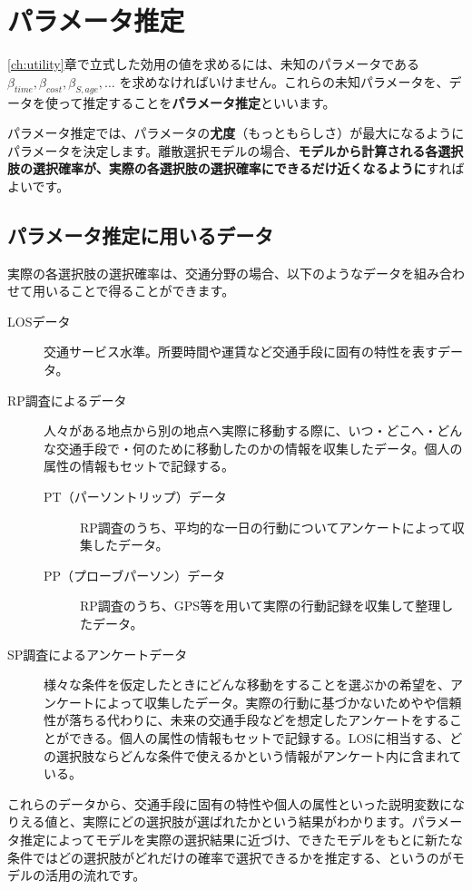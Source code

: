 \chapter{パラメータ推定}\label{ch:parameter_est}

\ref{ch:utility}章で立式した効用の値を求めるには、未知のパラメータである $\beta_{time}, \beta_{cost}, \beta_{S,age}, \ldots$ を求めなければいけません。これらの未知パラメータを、データを使って推定することを\textbf{パラメータ推定}といいます。

パラメータ推定では、パラメータの\textbf{尤度}（もっともらしさ）が最大になるようにパラメータを決定します。離散選択モデルの場合、\textbf{モデルから計算される各選択肢の選択確率が、実際の各選択肢の選択確率にできるだけ近くなるように}すればよいです。

\section{パラメータ推定に用いるデータ}\label{sec:data}

実際の各選択肢の選択確率は、交通分野の場合、以下のようなデータを組み合わせて用いることで得ることができます。

\begin{description}
    \item[LOSデータ]交通サービス水準。所要時間や運賃など交通手段に固有の特性を表すデータ。
    \item[RP調査によるデータ]人々がある地点から別の地点へ実際に移動する際に、いつ・どこへ・どんな交通手段で・何のために移動したのかの情報を収集したデータ。個人の属性の情報もセットで記録する。
    \begin{description}
        \item[PT（パーソントリップ）データ] RP調査のうち、平均的な一日の行動についてアンケートによって収集したデータ。
        \item[PP（プローブパーソン）データ] RP調査のうち、GPS等を用いて実際の行動記録を収集して整理したデータ。
    \end{description}
    \item[SP調査によるアンケートデータ]様々な条件を仮定したときにどんな移動をすることを選ぶかの希望を、アンケートによって収集したデータ。実際の行動に基づかないためやや信頼性が落ちる代わりに、未来の交通手段などを想定したアンケートをすることができる。個人の属性の情報もセットで記録する。LOSに相当する、どの選択肢ならどんな条件で使えるかという情報がアンケート内に含まれている。
\end{description}


これらのデータから、交通手段に固有の特性や個人の属性といった説明変数になりえる値と、実際にどの選択肢が選ばれたかという結果がわかります。パラメータ推定によってモデルを実際の選択結果に近づけ、できたモデルをもとに新たな条件ではどの選択肢がどれだけの確率で選択できるかを推定する、というのがモデルの活用の流れです。

